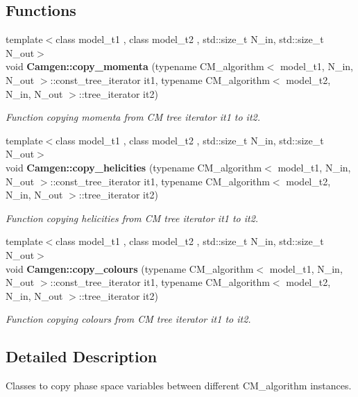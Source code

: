 \subsection*{Functions}
\begin{DoxyCompactItemize}
\item 
\hypertarget{a00849_a522b510143ac9bb66e5753230cc4d3dc}{{\footnotesize template$<$class model\-\_\-t1 , class model\-\_\-t2 , std\-::size\-\_\-t N\-\_\-in, std\-::size\-\_\-t N\-\_\-out$>$ }\\void {\bfseries Camgen\-::copy\-\_\-momenta} (typename C\-M\-\_\-algorithm$<$ model\-\_\-t1, N\-\_\-in, N\-\_\-out $>$\-::const\-\_\-tree\-\_\-iterator it1, typename C\-M\-\_\-algorithm$<$ model\-\_\-t2, N\-\_\-in, N\-\_\-out $>$\-::tree\-\_\-iterator it2)}\label{a00849_a522b510143ac9bb66e5753230cc4d3dc}

\begin{DoxyCompactList}\small\item\em Function copying momenta from C\-M tree iterator it1 to it2. \end{DoxyCompactList}\item 
\hypertarget{a00849_aa43e4ace819645b13d07004eb48d5dca}{{\footnotesize template$<$class model\-\_\-t1 , class model\-\_\-t2 , std\-::size\-\_\-t N\-\_\-in, std\-::size\-\_\-t N\-\_\-out$>$ }\\void {\bfseries Camgen\-::copy\-\_\-helicities} (typename C\-M\-\_\-algorithm$<$ model\-\_\-t1, N\-\_\-in, N\-\_\-out $>$\-::const\-\_\-tree\-\_\-iterator it1, typename C\-M\-\_\-algorithm$<$ model\-\_\-t2, N\-\_\-in, N\-\_\-out $>$\-::tree\-\_\-iterator it2)}\label{a00849_aa43e4ace819645b13d07004eb48d5dca}

\begin{DoxyCompactList}\small\item\em Function copying helicities from C\-M tree iterator it1 to it2. \end{DoxyCompactList}\item 
\hypertarget{a00849_a0417f9f7f76609cfe09278c293269270}{{\footnotesize template$<$class model\-\_\-t1 , class model\-\_\-t2 , std\-::size\-\_\-t N\-\_\-in, std\-::size\-\_\-t N\-\_\-out$>$ }\\void {\bfseries Camgen\-::copy\-\_\-colours} (typename C\-M\-\_\-algorithm$<$ model\-\_\-t1, N\-\_\-in, N\-\_\-out $>$\-::const\-\_\-tree\-\_\-iterator it1, typename C\-M\-\_\-algorithm$<$ model\-\_\-t2, N\-\_\-in, N\-\_\-out $>$\-::tree\-\_\-iterator it2)}\label{a00849_a0417f9f7f76609cfe09278c293269270}

\begin{DoxyCompactList}\small\item\em Function copying colours from C\-M tree iterator it1 to it2. \end{DoxyCompactList}\end{DoxyCompactItemize}


\subsection{Detailed Description}
Classes to copy phase space variables between different C\-M\-\_\-algorithm instances. 
